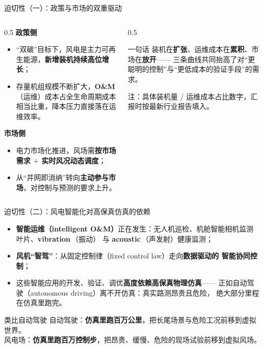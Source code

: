 \documentclass[aspectratio=169,10pt,UTF8]{ctexbeamer}
\newcommand{\hl}[1]{{\color{myblue}\bfseries #1}}
\newcommand{\hlr}[1]{{\color{myred}\bfseries #1}}
\newcommand{\term}[2]{\textbf{#1}\,（#2）}
\begin{document}
\begin{frame}{迫切性（一）：政策与市场的双重驱动}
  \begin{columns}[T]
    \begin{column}{0.5\textwidth}
      \textbf{政策侧}
      \begin{itemize}\small
        \item “双碳”目标下，风电是主力可再生能源，\hl{新增装机持续高位增长}；
        \item 存量机组规模不断扩大，\term{O\&M}{运维}成本占全生命周期成本
              相当比重，降本压力直接落在运维效率。
      \end{itemize}
      \vspace{0.3em}
      \textbf{市场侧}
      \begin{itemize}\small
        \item 电力市场化推进，风场需\hl{按市场需求 $+$ 实时风况动态调度}；
        \item 从“并网即消纳”转向\textbf{主动参与市场}，对控制与预测的要求上升。
      \end{itemize}
    \end{column}
    \begin{column}{0.5\textwidth}
      \begin{block}{一句话}
        \small 装机在\hl{扩张}、运维成本在\hl{累积}、市场在\hl{放开}——
        三条曲线共同抬高了对“更聪明的控制”与“更低成本的验证手段”的需求。
      \end{block}
      \vspace{0.6em}
      \begin{center}\scriptsize\color{gray}
        注：具体装机量 / 运维成本占比数字，汇报时按最新行业报告填入。
      \end{center}
    \end{column}
  \end{columns}
\end{frame}

\begin{frame}{迫切性（二）：风电智能化对高保真仿真的依赖}
  \begin{itemize}\small
    \item \hl{智能运维（intelligent O\&M）}正在发生：无人机巡检、机舱智能相机监测
          叶片、\term{vibration}{振动} 与 \term{acoustic}{声发射}健康监测；
    \item \hl{风机“智驾”}：从固定控制律（fixed control law）走向\textbf{数据驱动的
          智能协同控制}；
    \item 这些智能应用的开发、验证、调优\hlr{高度依赖高保真物理仿真}——
          正如自动驾驶（autonomous driving）离不开仿真：真实路测昂贵且危险，
          绝大部分里程在仿真里跑完。
  \end{itemize}
  \vfill
  \begin{block}{类比自动驾驶}
    \small 自动驾驶：\textbf{仿真里跑百万公里}，把长尾场景与危险工况前移到虚拟世界。\\
    风电场：\textbf{仿真里跑百万控制步}，把昂贵、缓慢、危险的现场试验前移到虚拟风场。
  \end{block}
\end{frame}
\end{document}
